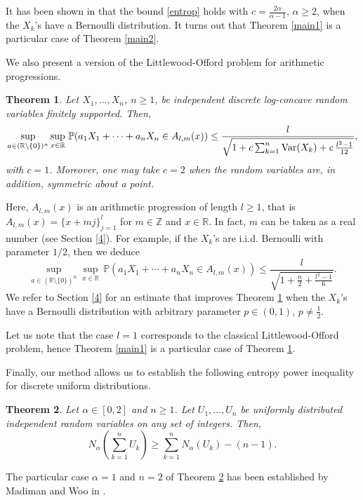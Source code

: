 \documentclass[11pt]{article}
\newtheorem{thm}{Theorem}[section]
\newcommand{\R}{\mathbb{R}}
\DeclareMathOperator{\Var}{Var}
\newcommand{\1}{[1]}
\newcommand{\Prob}{\mathbb{P}}
\def\Var{{\rm Var}}
\begin{document}
It has been shown in \cite{MMR} that the bound \eqref{entrop} holds with $c = \frac{2 \alpha}{\alpha - 1}$, $\alpha \geq 2$, when the $X_k$'s have a Bernoulli distribution. It turns out that Theorem \ref{main1} is a particular case of Theorem \ref{main2}.

We also present a version of the Littlewood-Offord problem for arithmetic progressions.

\begin{thm}\label{main3}
Let $X_1, \dots, X_n$, $n \geq 1$, be independent discrete log-concave random variables finitely supported. Then,
\begin{equation*}
\sup_{a \in (\R \setminus \{0\})^n} \sup_{x \in \R} \, \Prob(a_1 X_1 + \cdots + a_n X_n \in A_{l,m}(x)) \leq \frac{l}{\sqrt{1 + c \sum_{k=1}^n \Var(X_k) + c \, \frac{l^2-1}{12}}},
\end{equation*}
with $c=1$. Moreover, one may take $c = 2$ when the random variables are, in addition, symmetric about a point.
\end{thm}
Here, $A_{l,m}(x)$ is an arithmetic progression of length $l \geq 1$, that is $A_{l,m}(x) = \{x + mj \}_{j=1}^l$ for $m \in \mathbb{Z}$ and $x \in \mathbb{R}$. In fact, $m$ can be taken as a real number (see Section \ref{4}). For example, if the $X_k$'s are i.i.d. Bernoulli with parameter $1/2$, then we deduce
\[
    \sup_{a \in (\R \setminus \{0\})^n} \sup_{x \in \R} \, \Prob(a_1 X_1 + \cdots + a_n X_n \in A_{l,m}(x)) \leq \frac l {\sqrt{ 1 + \frac n 2 + \frac{l^2-1}{6}}}.
\]
We refer to Section \ref{4} for an estimate that improves Theorem \ref{main3} when the $X_k$'s have a Bernoulli distribution with arbitrary parameter $p \in (0,1)$, $p \neq \frac{1}{2}$.  

Let us note that the case $l = 1$ corresponds to the classical Littlewood-Offord problem, hence Theorem \ref{main1} is a particular case of Theorem \ref{main3}.

Finally, our method allows us to establish the following entropy power inequality for discrete uniform distributions.

\begin{thm}\label{EPI-unif}
    Let $\alpha \in [0, 2]$ and $n \geq 1$. Let $U_1, \dots, U_n$ be uniformly distributed independent random variables on any set of integers. Then,
    $$ N_{\alpha} \left( \sum_{k=1}^n U_k \right) \geq \sum_{k=1}^n N_{\alpha}(U_k) - (n-1). $$
\end{thm}

The particular case $\alpha = 1$ and $n=2$ of Theorem \ref{EPI-unif} has been established by Madiman and Woo in \cite{MW}.
\end{document}
